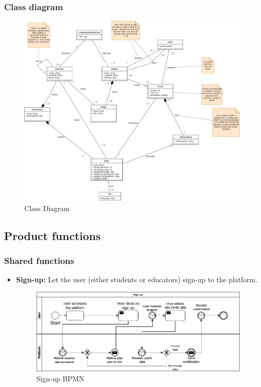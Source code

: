 \documentclass{article}
\begin{document}
{        \subsubsection{Class diagram}
        \begin{figure}[H]
            \centering
            \hspace*{-3cm}\includegraphics[scale=0.4]{images/ClassDiagram/ClassDiagramFinal.jpg}
            \caption{Class Diagram}
            \label{fig:classDiagram}
        \end{figure}
        
        \newpage
        
\subsection{Product functions}
    \subsubsection{Shared functions}
        \begin{itemize}
            \item \textbf{Sign-up:} Let the user (either students or educators) sign-up to the platform.
            \begin{figure}[H]
                \centering
                \includegraphics[scale=0.4]{images/BPMN/Sign_up.png}
                \caption{Sign-up BPMN}
                \label{fig:signUpBPMN}
            \end{figure}


\end{itemize}}
\end{document}
